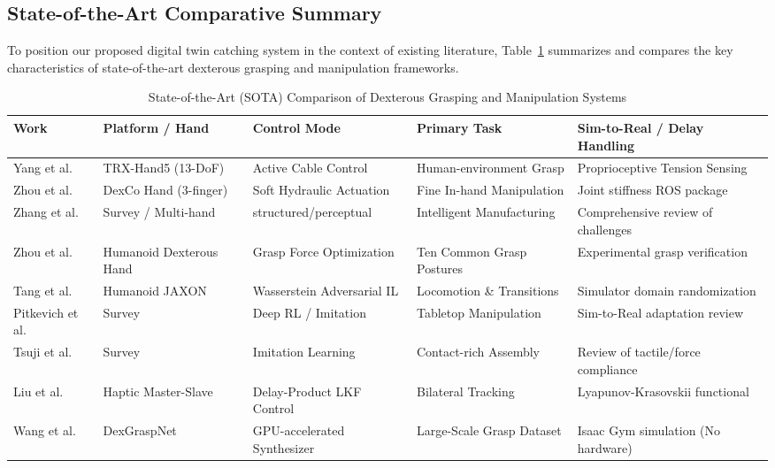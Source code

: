 \documentclass[letterpaper,journal]{IEEEtran}
\begin{document}
\subsection{State-of-the-Art Comparative Summary}
To position our proposed digital twin catching system in the context of existing literature, Table~\ref{tab:sota_comparison} summarizes and compares the key characteristics of state-of-the-art dexterous grasping and manipulation frameworks.

\begin{table}[t]
\centering
\caption{State-of-the-Art (SOTA) Comparison of Dexterous Grasping and Manipulation Systems}
\label{tab:sota_comparison}
\begin{tabular}{|l|l|l|l|p{4cm}|}
\hline
\textbf{Work} & \textbf{Platform / Hand} & \textbf{Control Mode} & \textbf{Primary Task} & \textbf{Sim-to-Real / Delay Handling} \\ \hline
Yang et al. \cite{trx_hand5} & TRX-Hand5 (13-DoF) & Active Cable Control & Human-environment Grasp & Proprioceptive Tension Sensing \\ \hline
Zhou et al. \cite{dexco_hand} & DexCo Hand (3-finger) & Soft Hydraulic Actuation & Fine In-hand Manipulation & Joint stiffness ROS package \\ \hline
Zhang et al. \cite{manufacturing_hand_review} & Survey / Multi-hand & structured/perceptual & Intelligent Manufacturing & Comprehensive review of challenges \\ \hline
Zhou et al. \cite{force_optimization} & Humanoid Dexterous Hand & Grasp Force Optimization & Ten Common Grasp Postures & Experimental grasp verification \\ \hline
Tang et al. \cite{humanmimic} & Humanoid JAXON & Wasserstein Adversarial IL & Locomotion \& Transitions & Simulator domain randomization \\ \hline
Pitkevich et al. \cite{sim2real_survey} & Survey & Deep RL / Imitation & Tabletop Manipulation & Sim-to-Real adaptation review \\ \hline
Tsuji et al. \cite{contact_survey} & Survey & Imitation Learning & Contact-rich Assembly & Review of tactile/force compliance \\ \hline
Liu et al. \cite{haptic_delay_lkf} & Haptic Master-Slave & Delay-Product LKF Control & Bilateral Tracking & Lyapunov-Krasovskii functional \\ \hline
Wang et al. \cite{dexgraspnet} & DexGraspNet & GPU-accelerated Synthesizer & Large-Scale Grasp Dataset & Isaac Gym simulation (No hardware) \\ \hline

\end{tabular}
\end{table}
\end{document}
